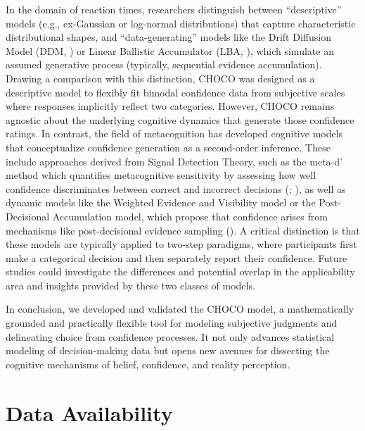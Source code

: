 \documentclass[
  jou,
  floatsintext,
  longtable,
  nolmodern,
  notxfonts,
  notimes,
  colorlinks=true,linkcolor=blue,citecolor=blue,urlcolor=blue]{apa7}
\begin{document}
In the domain of reaction times, researchers distinguish between
``descriptive'' models (e.g., ex-Gaussian or log-normal distributions)
that capture characteristic distributional shapes, and
``data-generating'' models like the Drift Diffusion Model (DDM,
) or Linear
Ballistic Accumulator (LBA, ), which simulate an assumed generative process
(typically, sequential evidence accumulation). Drawing a comparison with
this distinction, CHOCO was designed as a descriptive model to flexibly
fit bimodal confidence data from subjective scales where responses
implicitly reflect two categories. However, CHOCO remains agnostic about
the underlying cognitive dynamics that generate those confidence
ratings. In contrast, the field of metacognition has developed cognitive
models that conceptualize confidence generation as a second-order
inference. These include approaches derived from Signal Detection
Theory, such as the meta-d' method which quantifies metacognitive
sensitivity by assessing how well confidence discriminates between
correct and incorrect decisions
(;
), as well
as dynamic models like the Weighted Evidence and Visibility model or the
Post-Decisional Accumulation model, which propose that confidence arises
from mechanisms like post-decisional evidence sampling
(). A critical
distinction is that these models are typically applied to two-step
paradigms, where participants first make a categorical decision and then
separately report their confidence. Future studies could investigate the
differences and potential overlap in the applicability area and insights
provided by these two classes of models.

In conclusion, we developed and validated the CHOCO model, a
mathematically grounded and practically flexible tool for modeling
subjective judgments and delineating choice from confidence processes.
It not only advances statistical modeling of decision-making data but
opens new avenues for dissecting the cognitive mechanisms of belief,
confidence, and reality perception.

\section{Data Availability}\label{data-availability}
\end{document}
